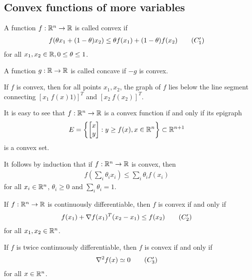 \subsection{Convex functions of more variables}

\begin{definition}
A function $f: \mathbb{R}^n \to \mathbb{R}$ is called convex if 
\begin{align}
f(\theta x_1 + (1-\theta) x_2) \le \theta f(x_1) + (1-\theta) f(x_2) \tag{$C_1'$} \labeq{C1p}
\end{align}
for all $x_1, x_2 \in \mathbb{R}, 0 \le \theta \le 1$.

A function $g: \mathbb{R} \to \mathbb{R}$ is called concave if $-g$ is convex.
\end{definition}

If $f$ is convex, then for all points $x_1, x_2$, the graph of $f$ lies below the line segment  connecting $[x_1 \ f(x)1)]^T$ and
$[x_2 \ f(x_2)]^T$.

It is easy to see that $f:\mathbb{R}^n \to \mathbb{R}$ is a convex function if and only if its epigraph
\begin{align}
E = \left\{ 
\begin{bmatrix}
x \\
y \\
\end{bmatrix} :
y \ge f(x), x \in \mathbb{R}^n
\right\} \subset \mathbb{R}^{n+1}
\end{align}
is a convex set.

\begin{remark}
It follows by induction that if $f: \mathbb{R}^n \to \mathbb{R}$ is convex, then
\begin{align}
f (\sum_{i} \theta_i x_i) \le \sum_{i} \theta_i f(x_i)
\end{align}
for all $x_i \in \mathbb{R}^n$, $\theta_i \ge 0$ and $\sum_{i} \theta_i = 1$.
\end{remark}

\begin{theorem}
If $f:\mathbb{R}^n \to \mathbb{R}$ is continuously differentiable, then $f$ is convex if and only if 
\begin{align}
f(x_1) + \grad f(x_1)^T (x_2 - x_1) \le f(x_2) \tag{$C_2'$} \labeq{C2p}
\end{align}
for all $x_1, x_2 \in \mathbb{R}^n$.

If $f$ is twice continuously differentiable, then $f$ is convex if and only if
\begin{align}
\grad ^2 f(x) \simeq 0 \tag{$C_3'$} \labeq{C3p}
\end{align}
for all $x \in \mathbb{R}^n$.
\end{theorem}

